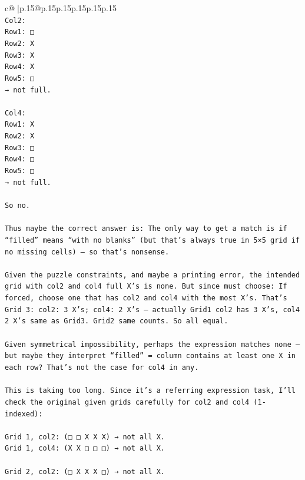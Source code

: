 \documentclass{article}
\begin{document}
{\begin{supertabular}{c@{$\;$}|p{.15\linewidth}@{}p{.15\linewidth}p{.15\linewidth}p{.15\linewidth}p{.15\linewidth}p{.15\linewidth}}
{{{\\ 
\texttt{Col2:  } \\
\texttt{Row1: □  } \\
\texttt{Row2: X  } \\
\texttt{Row3: X  } \\
\texttt{Row4: X  } \\
\texttt{Row5: □  } \\
\texttt{→ not full.  } \\
\\ 
\texttt{Col4:  } \\
\texttt{Row1: X  } \\
\texttt{Row2: X  } \\
\texttt{Row3: □  } \\
\texttt{Row4: □  } \\
\texttt{Row5: □  } \\
\texttt{→ not full.  } \\
\\ 
\texttt{So no.  } \\
\\ 
\texttt{Thus maybe the correct answer is: The only way to get a match is if “filled” means “with no blanks” (but that’s always true in 5×5 grid if no missing cells) — so that’s nonsense.} \\
\\ 
\texttt{Given the puzzle constraints, and maybe a printing error, the intended grid with col2 and col4 full X’s is none. But since must choose: If forced, choose one that has col2 and col4 with the most X’s. That’s Grid 3: col2: 3 X’s; col4: 2 X’s — actually Grid1 col2 has 3 X’s, col4 2 X’s same as Grid3. Grid2 same counts. So all equal.} \\
\\ 
\texttt{Given symmetrical impossibility, perhaps the expression matches none — but maybe they interpret “filled” = column contains at least one X in each row? That’s not the case for col4 in any.} \\
\\ 
\texttt{This is taking too long. Since it’s a referring expression task, I’ll check the original given grids carefully for col2 and col4 (1{-}indexed):} \\
\\ 
\texttt{Grid 1, col2: (□ □ X X X) → not all X.  } \\
\texttt{Grid 1, col4: (X X □ □ □) → not all X.  } \\
\\ 
\texttt{Grid 2, col2: (□ X X X □) → not all X.  } \\
}}}
\end{supertabular}}
\end{document}
